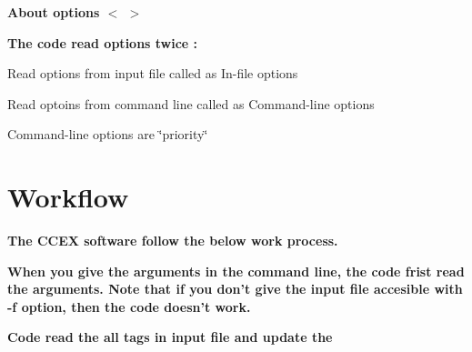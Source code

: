 {\bfseries {\bfseries {\bfseries  About options $<${\bfseries } $>$}}}

{\bfseries {\bfseries {\bfseries The code read options twice \-:
\begin{DoxyItemize}
\item Read options from input file called as In-\/file options
\item Read optoins from command line called as Command-\/line options \par
 Command-\/line options are \char`\"{}priority\char`\"{}
\end{DoxyItemize}}}}

{\bfseries {\bfseries {\bfseries }}}\hypertarget{GettingStarted_Workflow}{}\section{Workflow}\label{GettingStarted_Workflow}
{\bfseries {\bfseries {\bfseries  The C\-C\-E\-X software follow the below work process.}}}

{\bfseries {\bfseries {\bfseries When you give the arguments in the command line, the code frist read the arguments. Note that if you don't give the input file accesible with -\/f option, then the code doesn't work.}}}

{\bfseries {\bfseries {\bfseries Code read the all tags in input file and update the}}}

{\bfseries {\bfseries {\bfseries   }}}